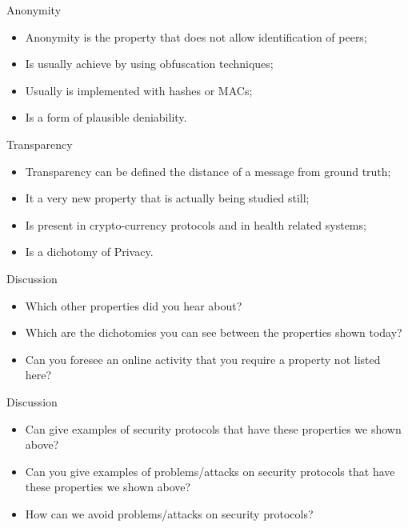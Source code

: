 \documentclass[12pt,table,xcolor={dvipsnames}]{beamer}
\begin{document}
\begin{frame}{Anonymity}
\begin{itemize}
\item Anonymity is the property that does not allow identification of peers;\pause
\item Is usually achieve by using obfuscation techniques;\pause
\item Usually is implemented with hashes or MACs;\pause
\item Is a form of plausible deniability.
\end{itemize}
\end{frame}

\begin{frame}{Transparency}
\begin{itemize}
\item Transparency can be defined the distance of a message from ground truth;\pause
\item It a very new property that is actually being studied still;\pause
\item Is present in crypto-currency protocols and in health related systems;\pause
\item Is a dichotomy of Privacy.
\end{itemize}
\end{frame}

\begin{frame}{Discussion}
\begin{itemize}
\item Which other properties did you hear about?\pause
\item Which are the dichotomies you can see between the properties shown today?\pause
\item Can you foresee an online activity that you require a property not listed here?
\end{itemize}
\end{frame}


\begin{frame}{Discussion}
\begin{itemize}
\item Can give examples of security protocols that have these properties we shown above?\pause
\item Can you give examples of problems/attacks on security protocols that have these properties we shown above?\pause
\item How can we avoid problems/attacks on security protocols?
\end{itemize}
\end{frame}
\end{document}
